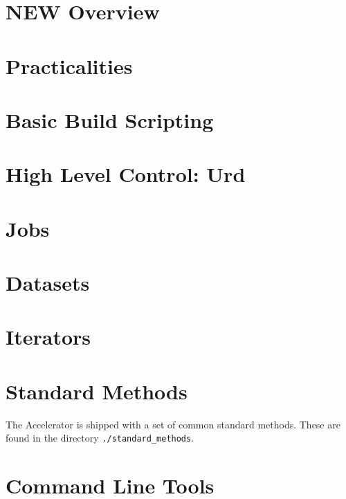 \documentclass[a4paper]{book}
\begin{document}




\chapter{NEW Overview}


%

\chapter{Practicalities}




\chapter{Basic Build Scripting}


\chapter{High Level Control:  Urd}


\chapter{Jobs}


\chapter{Datasets}


\chapter{Iterators}


\chapter{Standard Methods}
The Accelerator is shipped with a set of common standard methods.
These are found in the directory \texttt{./standard\_methods}.


\chapter{Command Line Tools}


%
\end{document}
